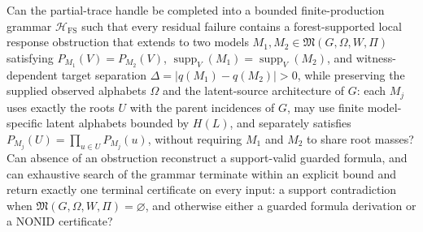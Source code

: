 Can the partial-trace handle be completed into a bounded finite-production grammar \(\mathcal H_{\mathrm{FS}}\) such that every residual failure contains a forest-supported local response obstruction that extends to two models \(M_1,M_2\in\mathfrak M(G,\Omega,W,\Pi)\) satisfying \(P_{M_1}(V)=P_{M_2}(V)\), \(\operatorname{supp}_V(M_1)=\operatorname{supp}_V(M_2)\), and witness-dependent target separation \(\Delta=|q(M_1)-q(M_2)|>0\), while preserving the supplied observed alphabets \(\Omega\) and the latent-source architecture of \(G\): each \(M_j\) uses exactly the roots \(U\) with the parent incidences of \(G\), may use finite model-specific latent alphabets bounded by \(H(L)\), and separately satisfies \(P_{M_j}(U)=\prod_{u\in U}P_{M_j}(u)\), without requiring \(M_1\) and \(M_2\) to share root masses? Can absence of an obstruction reconstruct a support-valid guarded formula, and can exhaustive search of the grammar terminate within an explicit bound and return exactly one terminal certificate on every input: a support contradiction when \(\mathfrak M(G,\Omega,W,\Pi)=\varnothing\), and otherwise either a guarded formula derivation or a NONID certificate?

